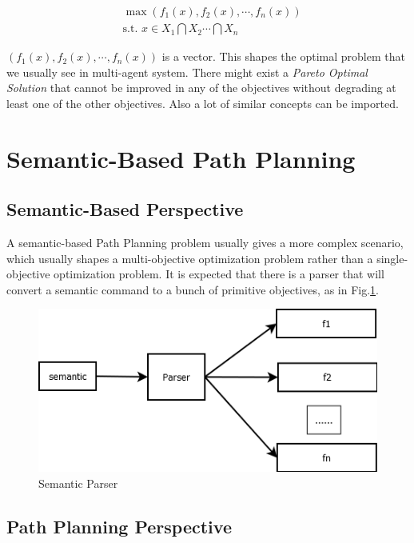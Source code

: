 \documentclass[12pt]{article}
\begin{document}
\begin{equation}
\label{eq:multiObjs}
\begin{aligned}
& \max \left( f_{1}(x) , f_{2}(x), \cdots , f_{n}(x)  \right) \\
& \mbox{s.t. } x \in X_{1} \bigcap X_{2} \cdots \bigcap X_{n}
\end{aligned}
\end{equation}

$ \left( f_{1}(x) , f_{2}(x), \cdots , f_{n}(x)  \right) $ is a vector. This shapes the optimal problem that we usually see in multi-agent system. There might exist a \emph{Pareto Optimal Solution} that cannot be improved in any of the objectives without degrading at least one of the other objectives. Also a lot of similar concepts can be imported.

\section{Semantic-Based Path Planning}

\subsection{Semantic-Based Perspective}

A semantic-based Path Planning problem usually gives a more complex scenario, which usually shapes a multi-objective optimization problem rather than a single-objective optimization problem. It is expected that there is a parser that will convert a semantic command to a bunch of primitive objectives, as in Fig.\ref{fig:parser}.

\begin{figure}[hb]
\centering
\includegraphics[width=0.7\linewidth]{./parser}
\caption{Semantic Parser}
\label{fig:parser}
\end{figure}

\subsection{Path Planning Perspective}
\end{document}
